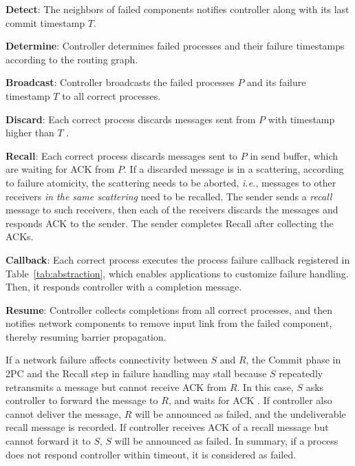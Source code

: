 \begin{ecompact}
\item \textbf{Detect}: The neighbors of failed components notifies controller along with its last commit timestamp $T$.
\item \textbf{Determine}: Controller determines failed processes and their failure timestamps according to the routing graph.
\item \textbf{Broadcast}: Controller broadcasts the failed processes $P$ and its failure timestamp $T$ to all correct processes.
\item \textbf{Discard}: Each correct process discards messages sent from $P$ with timestamp higher than $T$ .
\item \textbf{Recall}: Each correct process discards messages sent to $P$ in send buffer, which are waiting for ACK from $P$. If a discarded message is in a scattering, according to failure atomicity, the scattering needs to be aborted, \emph{i.e.}, messages to other receivers \emph{in the same scattering} need to be recalled. The sender sends a \emph{recall} message to such receivers, then each of the receivers discards the messages  and responds ACK to the sender. The sender completes Recall after collecting the ACKs.
\item \textbf{Callback}: Each correct process executes the process failure callback registered in Table~\ref{tab:abstraction}, which enables applications to customize failure handling. Then, it responds controller with a completion message.
\item \textbf{Resume}: Controller collects completions from all correct processes, and then notifies network components to remove input link from the failed component, thereby resuming barrier propagation.
\end{ecompact}

 If a network failure affects connectivity between $S$ and $R$, the Commit phase in 2PC and the Recall step in failure handling may stall because $S$ repeatedly retransmits a message but cannot receive ACK from $R$.
In this case, $S$ asks controller to forward the message to $R$, and waits for ACK . If controller also cannot deliver the message, $R$ will be announced as failed, and the undeliverable recall message is recorded. If controller receives ACK of a recall message but cannot forward it to $S$, $S$ will be announced as failed. In summary, if a process does not respond controller within timeout, it is considered as failed.

